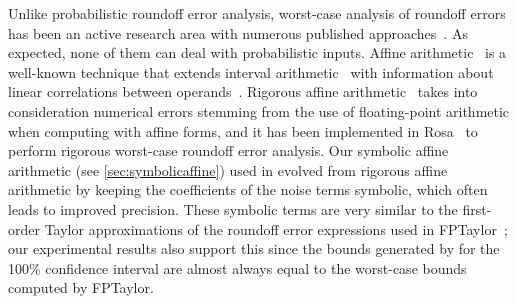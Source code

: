 %


Unlike probabilistic roundoff error analysis, worst-case analysis of roundoff errors has been an active research area
with numerous published approaches~\cite{gappa,gappapp,smartfloat,fluctuat,rangelab,precisa,darulova2018daisy,2015_fm_sjrg,solovyev2018rigorous,rosa,magron2017certified,pldi16-bit-level-fp-verification,zhendong2015,satire}. As expected, none of them can deal with probabilistic inputs.  Affine arithmetic~\cite{affineoriginal} is a well-known technique that extends interval arithmetic~\cite{intervalarithmetic} with information about linear correlations between operands~\cite{affinebook}.
%
Rigorous affine arithmetic~\cite{rigorousaffine} takes into consideration numerical errors stemming from the use of floating-point arithmetic when computing with affine forms, and it has been implemented in Rosa~\cite{rosa} to perform rigorous worst-case roundoff error analysis.
%
Our symbolic affine arithmetic (see \cref{sec:symbolicaffine}) used in \Tool evolved from rigorous affine arithmetic by keeping the coefficients of the noise terms symbolic, which often leads to improved precision.
%
These symbolic terms are very similar to the first-order Taylor approximations
of the roundoff error expressions used in
FPTaylor~\cite{2015_fm_sjrg,solovyev2018rigorous}; our experimental results
also support this since the bounds generated by \Tool for the 100\% confidence
interval are almost always equal to the worst-case bounds computed by FPTaylor.

